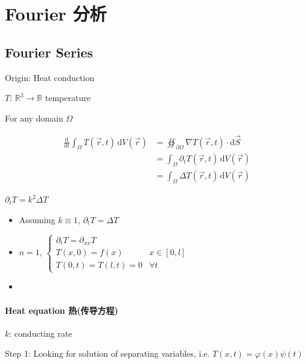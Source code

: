 \section{Fourier 分析}

\subsection*{Fourier Series}

Origin: Heat conduction

$T$: $\mathbb{R}^3\to\mathbb{R}$ temperature

For any domain $\Omega$

\begin{align*}
    \frac{\mathrm{d}}{\mathrm{d}t}\int_\Omega T\left(\overrightarrow{r},t\right)\,\mathrm{d}V\left(\overrightarrow{r}\right)
     & =\oiint_{\partial\Omega}\nabla T\left(\overrightarrow{r},t\right)\cdot\mathrm{d}\overrightarrow{S}      \\
     & =\int_{\Omega}\partial_t T\left(\overrightarrow{r},t\right)\,\mathrm{d}V\left(\overrightarrow{r}\right) \\
     & =\int_\Omega\Delta T\left(\overrightarrow{r},t\right)\,\mathrm{d}V\left(\overrightarrow{r}\right)
\end{align*}

$\partial_t T=k^2\Delta T$

\begin{itemize}
    \item Assuming $k\equiv 1$, $\partial_t T=\Delta T$
    \item $n=1$, $\begin{cases}
                  \partial_t T=\partial_{xx}T \\
                  T(x,0)=f(x)     & x\in[0,l] \\
                  T(0,t)=T(l,t)=0 & \forall t
              \end{cases}$
    \item \allbold{boundary value problem on $[0,l]\times[0,+\infty)$}
\end{itemize}

\paragraph*{Heat equation 热(传导方程)}

$k$: conducting rate

Step 1: Looking for solution of separating variables, i.e. $T(x,t)=\varphi(x)\psi(t)$

